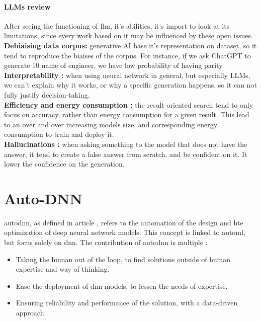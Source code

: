 \paragraph{LLMs review}
After seeing the functioning of \acrshort{llm}, it's abilities, it's import to look at its limitations, since every work based on it may be influenced by these open issues.\\
\textbf{Debiaising data corpus:} generative AI base it's representation on dataset, so it tend to reproduce the biaises of the corpus. For instance, if we ask ChatGPT to generate 10 name of engineer, we have low probability of having parity.\\
\textbf{Interpretability :} when using neural network in general, but especially LLMs, we can't explain why it works, or why a specific generation happens, so it can not fully justify decision-taking.\\
\textbf{Efficiency and energy consumption :} the result-oriented search tend to only focus on accuracy, rather than energy consumption for a given result. This lead to an over and over increasing models size, and corresponding energy consumption to train and deploy it.\\
\textbf{Hallucinations\cite{bang_multitask_2023} :} when asking something to the model that does not have the answer, it tend to create a false answer from scratch, and be confident on it. It lower the confidence on the generation. 


\section{Auto-DNN}
\label{sec:autodnn}
\acrfull{autodnn}, as defined in article \cite{talbi_automated_2021}, refers to the automation of the design and hte optimization of deep neural network models. This concept is linked to \acrfull{automl}, but focus solely on \acrshort{dnn}. The contribution of \acrshort{autodnn} is multiple : 
\begin{itemize}
    \item Taking the human out of the loop, to find solutions outside of human expertise and way of thinking.
    \item Ease the deployment of \acrshort{dnn} models, to lessen the needs of expertise.
    \item Ensuring reliability and performance of the solution, with a data-driven approach.
\end{itemize}

